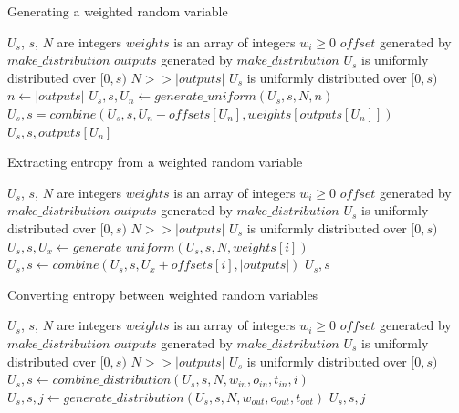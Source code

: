 \documentclass[12pt]{article}
\begin{document}
\begin{algorithm}
\caption{Generating a weighted random variable}
\label{alg:generate-distribution}
\begin{algorithmic}[1]
\Require $U_s$, $s$, $N$ are integers
\Require $weights$ is an array of integers $w_i \ge 0$
\Require $offset$ generated by $make\_distribution$ 
\Require $outputs$ generated by $make\_distribution$
\Require $U_s$ is uniformly distributed over $[0,s)$
\Require $N >> |outputs|$
\Ensure $U_s$ is uniformly distributed over $[0,s)$
    \State $n \gets |outputs|$
    \State $U_s, s, U_n \gets generate\_uniform(U_s, s, N, n)$
    \State $U_s, s = combine(U_s, s, U_n - offsets[U_n], weights[outputs[U_n]])$
    \State \Return $U_s, s, outputs[U_n]$
\EndProcedure
\end{algorithmic}
\end{algorithm}


\begin{algorithm}
\caption{Extracting entropy from a weighted random variable}
\label{alg:combine-distribution}
\begin{algorithmic}[1]
\Require $U_s$, $s$, $N$ are integers
\Require $weights$ is an array of integers $w_i \ge 0$
\Require $offset$ generated by $make\_distribution$ 
\Require $outputs$ generated by $make\_distribution$
\Require $U_s$ is uniformly distributed over $[0,s)$
\Require $N >> |outputs|$
\Ensure $U_s$ is uniformly distributed over $[0,s)$
    \State $U_s, s, U_x \gets generate\_uniform(U_s, s, N, weights[i])$
    \State $U_s, s \gets combine(U_s, s, U_x + offsets[i], |outputs|)$
    \State \Return $U_s, s$
\EndProcedure
\end{algorithmic}
\end{algorithm}

\begin{algorithm}
\caption{Converting entropy between weighted random variables}
\label{alg:convert-distribution}
\begin{algorithmic}[1]
\Require $U_s$, $s$, $N$ are integers
\Require $weights$ is an array of integers $w_i \ge 0$
\Require $offset$ generated by $make\_distribution$ 
\Require $outputs$ generated by $make\_distribution$
\Require $U_s$ is uniformly distributed over $[0,s)$
\Require $N >> |outputs|$
\Ensure $U_s$ is uniformly distributed over $[0,s)$
    \State $U_s, s \gets combine\_distribution(U_s, s, N, w_{in}, o_{in}, t_{in}, i)$
    \State $U_s, s, j \gets generate\_distribution(U_s, s, N, w_{out}, o_{out}, t_{out})$
    \State \Return $U_s, s, j$
\EndProcedure
\end{algorithmic}
\end{algorithm}
\end{document}
